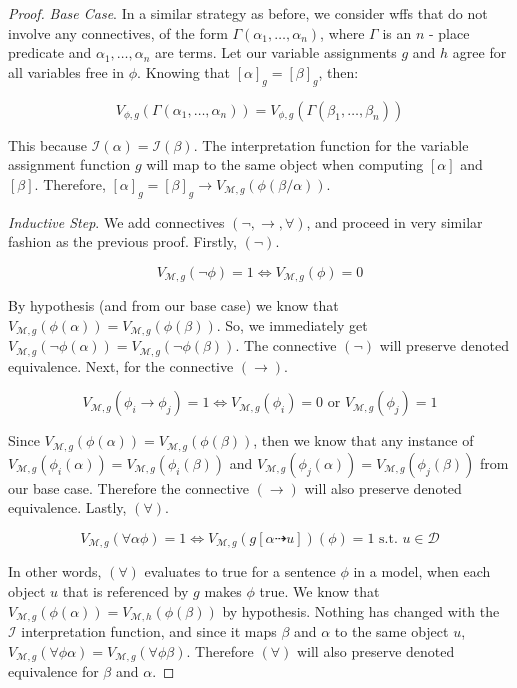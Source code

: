 \documentclass{article}
\begin{document}
    \begin{proof}
        \textit{Base Case}. In a similar strategy as before, we consider wffs that do not involve any connectives, of the form $\Gamma(\alpha_1, \dots , \alpha_n)$, where $\Gamma$ is an $n$ - place predicate and $\alpha_1, \dots, \alpha_n$ are terms.
        Let our variable assignments $g$ and $h$ agree for all variables free in $\phi$. Knowing that $[\alpha]_g = [\beta]_g$, then:

        $$V_{\mathscr{\phi}, g}(\Gamma(\alpha_1, \dots, \alpha_n)) = V_{\mathscr{\phi}, g}(\Gamma(\beta_1, \dots, \beta_n))$$

        This because $\mathscr{I}(\alpha) = \mathscr{I}(\beta)$. The interpretation function for the variable assignment function $g$ will map to the same object when computing $[\alpha]$ and $[\beta]$.
        Therefore, $[\alpha]_g = [\beta]_g \rightarrow V_{\mathscr{M}, g}(\phi(\beta / \alpha))$.

        \noindent \textit{Inductive Step}. We add connectives $(\lnot, \rightarrow, \forall)$, and proceed in very similar fashion as the previous proof.
        Firstly, $(\lnot)$.

        $$V_{\mathscr{M}, g}(\lnot\phi) = 1 \iff V_{\mathscr{M},g}(\phi) = 0$$

        By hypothesis (and from our base case) we know that $V_{\mathscr{M}, g}(\phi(\alpha)) = V_{\mathscr{M}, g}(\phi(\beta))$. So, we immediately get 
        $V_{\mathscr{M}, g}(\lnot \phi(\alpha)) = V_{\mathscr{M}, g}(\lnot \phi(\beta))$.
        The connective $(\lnot)$ will preserve denoted equivalence.
        Next, for the connective $(\rightarrow)$. 

        $$V_{\mathscr{M}, g}(\phi_i \rightarrow \phi_j) = 1 \iff V_{\mathscr{M}, g}(\phi_i) = 0 \text{ or } V_{\mathscr{M}, g}(\phi_j) = 1$$

        Since $V_{\mathscr{M},g}(\phi(\alpha)) = V_{\mathscr{M}, g}(\phi(\beta))$, then we know that any instance of $V_{\mathscr{M}, g}(\phi_i(\alpha)) = V_{\mathscr{M}, g}(\phi_i(\beta))$ and $V_{\mathscr{M}, g}(\phi_j(\alpha)) = V_{\mathscr{M},g}(\phi_j(\beta))$
        from our base case. Therefore the connective $(\rightarrow)$ will also preserve denoted equivalence.
        Lastly, $(\forall)$.

        $$V_{\mathscr{M}, g}(\forall\alpha \phi) = 1 \iff V_{\mathscr{M}, g} (g[\alpha \dashrightarrow u] )(\phi) = 1 \text{ s.t. } u \in \mathscr{D}$$

        In other words, $(\forall)$ evaluates to true for a sentence $\phi$ in a model, when each object $u$ that is referenced by $g$ makes $\phi$ true.
        We know that $V_{\mathscr{M}, g}(\phi(\alpha))  = V_{\mathscr{M}, h}(\phi(\beta))$ by hypothesis. Nothing has changed with the $\mathscr{I}$ interpretation function, and since it maps $\beta$ and $\alpha$ to the same object $u$, $V_{\mathscr{M}, g}(\forall\phi\alpha) = V_{\mathscr{M}, g}(\forall\phi\beta)$.
        Therefore $(\forall)$ will also preserve denoted equivalence for $\beta$ and $\alpha$.


\end{proof}
\end{document}
